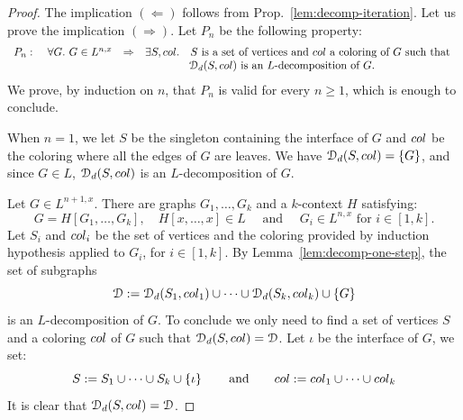 \begin{proof} 
The implication $(\Leftarrow)$ follows from Prop.~\ref{lem:decomp-iteration}. Let us prove the implication $(\Rightarrow)$.  Let $P_n$ be the following property:
$$\begin{array}{lrll}
P_n:&\ \forall G.\  G\in L^{n,x}& \Rightarrow& \exists S, \col.\quad  S \text{ is a set of vertices and $\col$ a coloring of $G$ such that }\\
 &                      &             & \qquad\qquad \cD_\mathsf{d}(S,\col) \text{ is an $L$-decomposition of $G$.} 
\end{array}
$$
We prove, by induction on $n$, that $P_n$ is valid for every $n\geq 1$, which  is enough to conclude. 
\medskip

 When $n=1$, we let $S$ be the singleton containing the interface of $G$ and  $\col$ be the coloring where all the edges of $G$ are leaves. We have $\cD_\mathsf{d}(S,\col)=\set{G}$, and since $G\in L$,   $\cD_\mathsf{d}(S,\col)$ is an $L$-decomposition of $G$.
\medskip

 Let $G\in L^{n+1,x}$. There are graphs $G_1, \dots, G_k$ and a $k$-context $H$ satisfying:
 $$G=H[G_1,\dots, G_k], \quad H[x,\dots,x]\in L\quad \text{ and }\quad  G_i\in L^{n,x} \text{ for } i\in[1,k].$$
 Let $S_i$ and $\col_i$ be the set of vertices and the coloring provided by induction hypothesis applied to $G_i$, for $i\in[1,k]$. 
 By Lemma~\ref{lem:decomp-one-step}, the set of subgraphs
 $$\cD:=\cD_\mathsf{d}(S_1,\col_1)\cup\dots\cup\cD_\mathsf{d}(S_k,\col_k)\cup\set{G}$$
 is an $L$-decomposition of $G$. To conclude we only need to find a set of vertices $S$ and a coloring $\col$ of $G$ such that $\cD_\mathsf{d}(S,\col)=\cD$. Let $\iota$ be the interface of $G$, we set:
    $$S:=S_1\cup\dots\cup S_k\cup\set{\iota} \qquad\text{and}\qquad \col:=\col_1\cup\dots\cup \col_k$$
It is clear that $\cD_\mathsf{d}(S,\col)=\cD$.
\end{proof}

